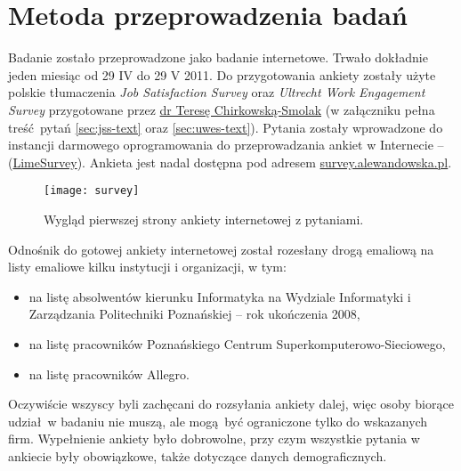 \section{Metoda przeprowadzenia badań}
Badanie zostało przeprowadzone jako badanie internetowe. Trwało dokładnie jeden miesiąc od 29 IV do 29 V 2011. Do przygotowania ankiety zostały użyte polskie tłumaczenia \emph{Job Satisfaction Survey} oraz \emph{Ultrecht Work Engagement Survey} przygotowane przez \href{http://www.psychologia.amu.edu.pl/ip-uam/struktura-zatrudnienia-w-instytucie/curriculum-vitae-teresa-chirkowska-smolak/}{dr Teresę Chirkowską-Smolak} (w załączniku pełna treść pytań \ref{sec:jss-text} oraz \ref{sec:uwes-text}). Pytania zostały wprowadzone do instancji darmowego oprogramowania do przeprowadzania ankiet
w Internecie -- (\href{http://www.limesurvey.org/}{LimeSurvey}). Ankieta jest nadal dostępna pod
adresem \url{survey.alewandowska.pl}.

\begin{figure}[h]
\begin{center}
\texttt{[image: survey]}
\end{center}
\caption{Wygląd pierwszej strony ankiety internetowej z pytaniami.}
\label{fig:sex}
\end{figure}

Odnośnik do gotowej ankiety internetowej został rozesłany drogą emaliową na listy emaliowe kilku instytucji i organizacji, w tym:
\begin{itemize}
\item na listę absolwentów kierunku Informatyka na Wydziale Informatyki i Zarządzania Politechniki Poznańskiej -- rok ukończenia 2008,
\item na listę pracowników Poznańskiego Centrum Superkomputerowo-Sieciowego,
\item na listę pracowników Allegro.
\end{itemize}
Oczywiście wszyscy byli zachęcani do rozsyłania ankiety dalej, więc osoby biorące udział w badaniu nie muszą, ale mogą być ograniczone tylko do wskazanych firm. Wypełnienie ankiety było dobrowolne, przy czym wszystkie pytania w ankiecie były obowiązkowe, także dotyczące danych demograficznych.
